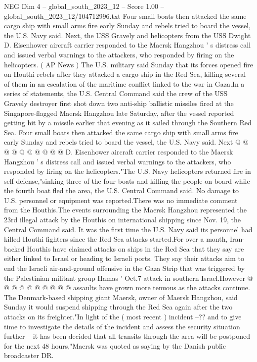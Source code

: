 \begin{textsample}{NEG Dim 4 – global\_south\_2023\_12 – Score 1.00 – global\_south\_2023\_12/104712996.txt}  \label{ex:f4_neg_322}
Four small boats then attacked the same cargo ship with small arms fire early Sunday and rebels tried to board the vessel, the U.S.
Navy said.
Next, the USS Gravely and helicopters from the USS Dwight D.
Eisenhower aircraft carrier responded to the Maersk Hangzhou ' s distress call and issued verbal warnings to the attackers, who responded by firing on the helicopters. ( AP News ) The U.S. military said Sunday that its forces opened fire on Houthi rebels after they attacked a cargo ship in the Red Sea, killing several of them in an escalation of the maritime conflict linked to the war in Gaza.In a series of statements, the U.S.
Central Command said the crew of the USS Gravely destroyer first shot down two anti-ship ballistic missiles fired at the Singapore-flagged Maersk Hangzhou late Saturday, after the vessel reported getting hit by a missile earlier that evening as it sailed through the Southern Red Sea.
Four small boats then attacked the same cargo ship with small arms fire early Sunday and rebels tried to board the vessel, the U.S.
Navy said.
Next @ @ @ @ @ @ @ @ @ @ D.
Eisenhower aircraft carrier responded to the Maersk Hangzhou ' s distress call and issued verbal warnings to the attackers, who responded by firing on the helicopters."The U.S.
Navy helicopters returned fire in self-defense,"sinking three of the four boats and killing the people on board while the fourth boat fled the area, the U.S.
Central Command said.
No damage to U.S. personnel or equipment was reported.There was no immediate comment from the Houthis.The events surrounding the Maersk Hangzhou represented the 23rd illegal attack by the Houthis on international shipping since Nov. 19, the Central Command said.
It was the first time the U.S.
Navy said its personnel had killed Houthi fighters since the Red Sea attacks started.For over a month, Iran-backed Houthis have claimed attacks on ships in the Red Sea that they say are either linked to Israel or heading to Israeli ports.
They say their attacks aim to end the Israeli air-and-ground offensive in the Gaza Strip that was triggered by the Palestinian militant group Hamas ' Oct.7 attack in southern Israel.However @ @ @ @ @ @ @ @ @ @ assaults have grown more tenuous as the attacks continue.
The Denmark-based shipping giant Maersk, owner of Maersk Hangzhou, said Sunday it would suspend shipping through the Red Sea again after the two attacks on its freighter."In light of the ( most recent ) incident --?? and to give time to investigate the details of the incident and assess the security situation further -- it has been decided that all transits through the area will be postponed for the next 48 hours,"Maersk was quoted as saying by the Danish public broadcaster DR.

\end{textsample}
